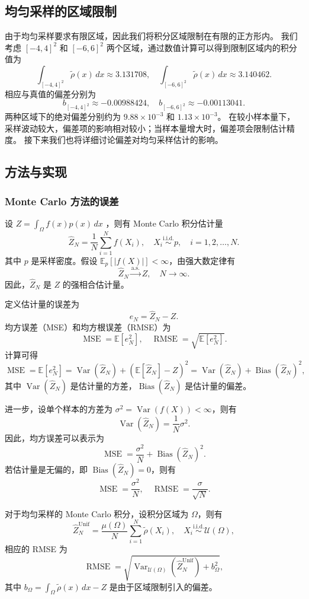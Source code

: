 \documentclass[12pt,a4paper]{ctexart}
\newcommand{\E}{\mathbb{E}}
\DeclareMathOperator{\Var}{Var}
\DeclareMathOperator{\Bias}{Bias}
\newcommand{\rhoT}{\widetilde{\rho}}
\begin{document}
\subsection{均匀采样的区域限制}

由于均匀采样要求有限区域，因此我们将积分区域限制在有限的正方形内。
我们考虑 $[-4,4]^2$ 和 $[-6,6]^2$ 两个区域，通过数值计算可以得到限制区域内的积分值为
\[
\int_{[-4,4]^2} \rhoT(x) \, dx \approx 3.131708, \quad \int_{[-6,6]^2} \rhoT(x) \, dx \approx 3.140462.
\]
相应与真值的偏差分别为
\[
b_{[-4,4]^2} \approx -0.00988424, \quad b_{[-6,6]^2} \approx -0.00113041.
\]
两种区域下的绝对偏差分别约为 $9.88\times10^{-3}$ 和 $1.13\times10^{-3}$。
在较小样本量下，采样波动较大，偏差项的影响相对较小；当样本量增大时，偏差项会限制估计精度。
接下来我们也将详细讨论偏差对均匀采样估计的影响。

\subsection{方法与实现}

\subsubsection{Monte Carlo 方法的误差}

设 $Z = \int_{\Omega} f(x)p(x) \, dx$ ，则有 Monte Carlo 积分估计量
\[
\widehat{Z}_N = \frac{1}{N} \sum_{i=1}^{N} f(X_i), \quad X_i \overset{\text{i.i.d.}}{\sim} p, \quad i=1,2,\ldots,N.
\]
其中 $p$ 是采样密度。假设 $\E_p[|f(X)|]<\infty$，由强大数定律有
\[
\widehat{Z}_N \xrightarrow{\text{a.s.}} Z, \quad N \to \infty.
\]
因此，$\widehat{Z}_N$ 是 $Z$ 的强相合估计量。

定义估计量的误差为
\[
e_N=\widehat{Z}_N-Z.
\]
均方误差（MSE）和均方根误差（RMSE）为
\[
\operatorname{MSE}=\E[e_N^2], \quad \operatorname{RMSE}=\sqrt{\E[e_N^2]}.
\]
计算可得
\[
\operatorname{MSE}=\E[e_N^2]=\Var(\widehat{Z}_N)+(\E[\widehat{Z}_N]-Z)^2=\Var(\widehat{Z}_N)+\Bias(\widehat{Z}_N)^2,
\]
其中 $\Var(\widehat{Z}_N)$ 是估计量的方差，$\Bias(\widehat{Z}_N)$ 是估计量的偏差。

进一步，设单个样本的方差为 $\sigma^2=\Var(f(X))<\infty$，则有
\[
\Var(\widehat{Z}_N) = \frac{1}{N} \sigma^2.
\]
因此，均方误差可以表示为
\[
\operatorname{MSE} = \frac{\sigma^2}{N} + \Bias(\widehat{Z}_N)^2.
\]
若估计量是无偏的，即 $\Bias(\widehat{Z}_N) = 0$，则有
\[
\operatorname{MSE} = \frac{\sigma^2}{N}, \quad \operatorname{RMSE} = \frac{\sigma}{\sqrt{N}}.
\]

对于均匀采样的 Monte Carlo 积分，设积分区域为 $\Omega$，则有
\[
\widehat Z_N^{\mathrm{Unif}} = \frac{\mu(\Omega)}{N} \sum_{i=1}^{N} \rhoT(X_i), \quad X_i \overset{\text{i.i.d.}}{\sim} \mathcal U(\Omega),
\]
相应的 RMSE 为
\[
\operatorname{RMSE} = \sqrt{\Var_{\mathcal U(\Omega)}(\widehat Z_N^{\mathrm{Unif}}) + b_{\Omega}^2},
\]
其中 $b_{\Omega} = \int_{\Omega} \rhoT(x) \, dx - Z$ 是由于区域限制引入的偏差。
\end{document}

